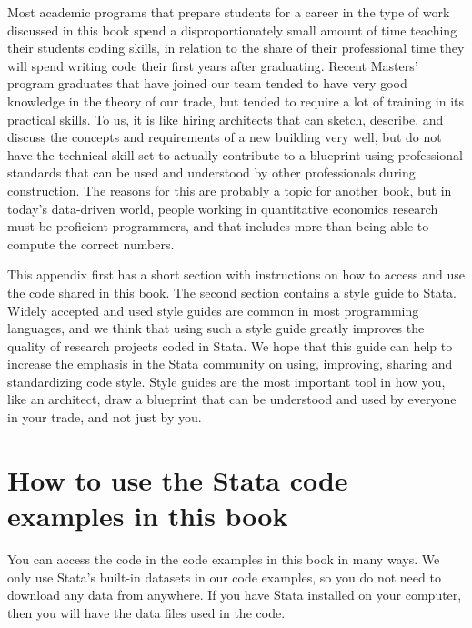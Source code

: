
\begin{fullwidth}

Most academic programs that prepare students for a career in the type of work discussed in this book
spend a disproportionately small amount of time teaching their students coding skills, in relation to the share of
their professional time they will spend writing code their first years after graduating. Recent
Masters' program graduates that have joined our team tended to have very good knowledge in the theory of our
trade, but tended to require a lot of training in its practical skills. To us, it is like hiring architects
that can sketch, describe, and discuss the concepts and requirements of a new building very well, but do
not have the technical skill set to actually contribute to a blueprint using professional standards that can be used
and understood by other professionals during construction. The reasons for this are probably a topic
for another book, but in today's data-driven world, people working in quantitative economics research
must be proficient programmers, and that includes more than being able to compute the correct numbers.

This appendix first has a short section with instructions on how to access and use the code shared in
this book. The second section contains a style guide to Stata. Widely accepted and used style guides
are common in most programming languages, and we think that using such a style guide greatly improves the quality
of research projects coded in Stata. We hope that this guide can  help to increase the emphasis in the Stata community on using,
improving, sharing and standardizing code style. Style guides are the most important tool in how
you, like an architect, draw a blueprint that can be understood and used by everyone in your trade,
and not just by you.

\end{fullwidth}


\section{How to use the Stata code examples in this book}

You can access the code in the code examples in this book in many ways. We only use Stata's built-in
datasets in our code examples, so you do not need to download any data from anywhere. If you have
Stata installed on your computer, then you will have the data files used in the code.

